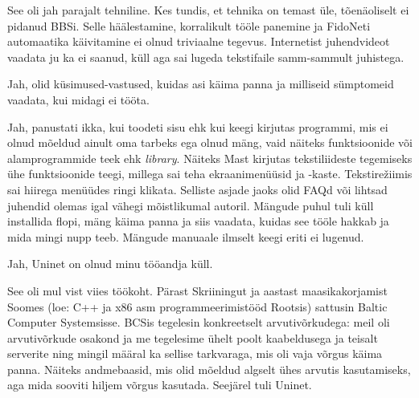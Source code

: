 
See oli jah parajalt tehniline. Kes tundis, et tehnika on temast 
üle, tõenäoliselt ei pidanud BBSi. Selle
häälestamine, korralikult tööle panemine ja FidoNeti 
automaatika käivitamine ei olnud triviaalne tegevus. Internetist juhendvideot vaadata ju ka ei saanud, küll 
aga sai lugeda tekstifaile samm-sammult juhistega.


Jah, olid küsimused-vastused, kuidas asi käima panna ja milliseid sümptomeid vaadata, kui midagi ei tööta.


Jah, panustati ikka, kui toodeti sisu ehk kui keegi kirjutas 
programmi, mis ei olnud mõeldud ainult oma tarbeks ega olnud mäng, 
vaid näiteks funktsioonide või alamprogrammide teek ehk 
\emph{library}. Näiteks Mast kirjutas 
tekstiliideste tegemiseks ühe funktsioonide teegi, millega sai teha ekraanimenüüsid ja 
-kaste. Tekstirežiimis sai
hiirega menüüdes ringi klikata. Selliste asjade jaoks olid 
FAQd või lihtsad juhendid olemas igal vähegi mõistlikumal 
autoril. Mängude puhul tuli küll installida flopi, mäng käima panna
ja siis vaadata, kuidas see tööle hakkab ja mida mingi nupp 
teeb. Mängude manuaale ilmselt keegi eriti ei lugenud.


Jah, Uninet on olnud minu tööandja küll.


See oli mul vist viies töökoht. Pärast Skriiningut ja aastast maasikakorjamist Soomes
(loe: C++ ja x86 asm programmeerimistööd Rootsis) sattusin Baltic 
Computer Systemsisse.
BCSis tegelesin konkreetselt arvutivõrkudega: 
meil oli arvutivõrkude osakond ja me tegelesime ühelt poolt 
kaabeldusega ja teisalt serverite ning mingil määral ka sellise 
tarkvaraga, mis oli vaja võrgus käima panna. Näiteks andmebaasid, mis olid 
mõeldud algselt ühes arvutis kasutamiseks, aga mida sooviti hiljem võrgus kasutada. Seejärel tuli Uninet.

